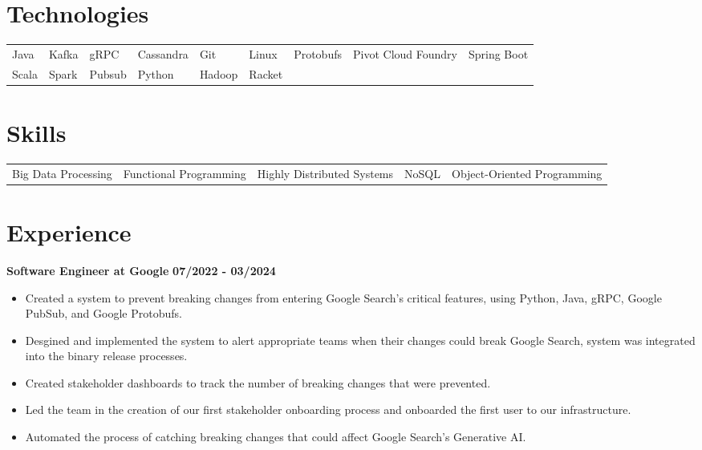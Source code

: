 \documentclass{res}
\begin{document}
\address{www.anthonyhicksiii.com}
\address{ahicks3rd@gmail.com}

\setlength\itemsep{0em}

\begin{resume}
\section{\large{Technologies}}
\begin{tabular}{l	l	l 	l	l   l	l 	l 	l} 
	Java  & Kafka   & gRPC & Cassandra  & Git & Linux & Protobufs & Pivot Cloud Foundry & Spring Boot \\ 
	Scala & Spark 	& Pubsub & Python & Hadoop & Racket
\end{tabular}

\section{\large{Skills}}
\begin{tabular}{	l 	l 	l 	l	l 	}
	Big Data Processing & Functional Programming & Highly Distributed Systems & NoSQL & Object-Oriented Programming 
\end{tabular}

\section{\large{Experience}}
	\textbf{Software Engineer at Google}
	\hfill{\bf 07/2022 - 03/2024}
	\begin{itemize}
		\item Created a system to prevent breaking changes from entering Google Search's critical features, using Python, Java, gRPC, Google PubSub, and Google Protobufs.
		\item Desgined and implemented the system to alert appropriate teams when their changes could break Google Search, system was integrated into the binary release processes. 
		\item Created stakeholder dashboards to track the number of breaking changes that were prevented.
		\item Led the team in the creation of our first stakeholder onboarding process and onboarded the first user to our infrastructure.
		\item Automated the process of catching breaking changes that could affect Google Search's Generative AI.
	\end{itemize}
	

\end{resume}
\end{document}
